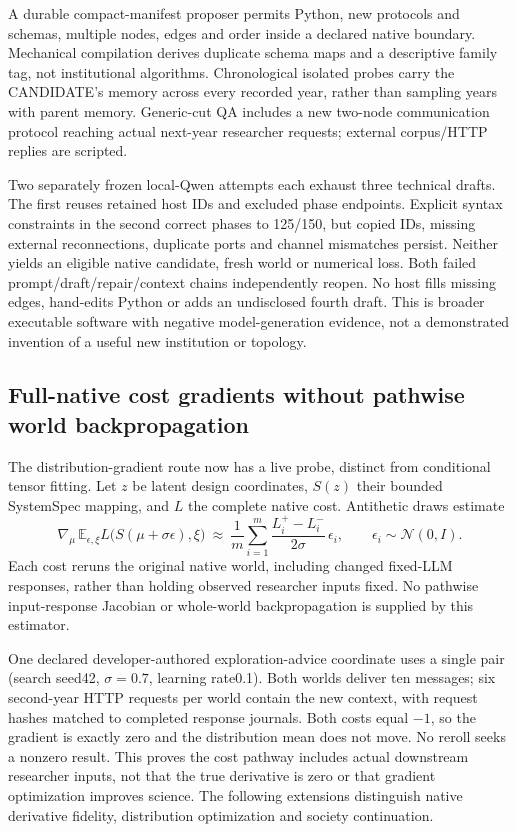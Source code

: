 A durable compact-manifest proposer permits Python, new protocols and schemas,
multiple nodes, edges and order inside a declared native boundary. Mechanical
compilation derives duplicate schema maps and a descriptive family tag, not
institutional algorithms. Chronological isolated probes carry the CANDIDATE's
memory across every recorded year, rather than sampling years with parent
memory. Generic-cut QA includes a new two-node communication protocol reaching
actual next-year researcher requests; external corpus/HTTP replies are scripted.

Two separately frozen local-Qwen attempts each exhaust three technical drafts.
The first reuses retained host IDs and excluded phase endpoints. Explicit
syntax constraints in the second correct phases to 125/150, but copied IDs,
missing external reconnections, duplicate ports and channel mismatches persist.
Neither yields an eligible native candidate, fresh world or numerical loss.
Both failed prompt/draft/repair/context chains independently reopen. No host
fills missing edges, hand-edits Python or adds an undisclosed fourth draft.
This is broader executable software with negative model-generation evidence,
not a demonstrated invention of a useful new institution or topology.



\subsection{Full-native cost gradients without pathwise world backpropagation}

The distribution-gradient route now has a live probe, distinct from conditional
tensor fitting. Let $z$ be latent design coordinates, $S(z)$ their bounded
SystemSpec mapping, and $L$ the complete native cost. Antithetic draws estimate
\begin{equation}
 \nabla_\mu\,\mathbb{E}_{\epsilon,\xi}
 L\bigl(S(\mu+\sigma\epsilon),\xi\bigr)
 \ \approx\ \frac{1}{m}\sum_{i=1}^m
 \frac{L_i^+-L_i^-}{2\sigma}\,\epsilon_i,
 \qquad \epsilon_i\sim\mathcal{N}(0,I).
\end{equation}
Each cost reruns the original native world, including changed fixed-LLM
responses, rather than holding observed researcher inputs fixed. No pathwise
input-response Jacobian or whole-world backpropagation is supplied by this
estimator.

One declared developer-authored exploration-advice coordinate uses a single
pair (search seed42, $\sigma=0.7$, learning rate0.1). Both worlds deliver ten
messages; six second-year HTTP requests per world contain the new context,
with request hashes matched to completed response journals. Both costs equal
$-1$, so the gradient is exactly zero and the distribution mean does not move.
No reroll seeks a nonzero result. This proves the cost pathway includes actual
downstream researcher inputs, not that the true derivative is zero or that
gradient optimization improves science. The following extensions distinguish
native derivative fidelity, distribution optimization and society continuation.

